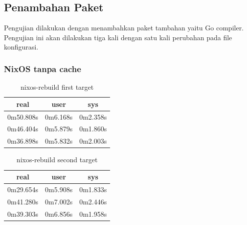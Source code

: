 \documentclass[10pt,]{report}
\begin{document}
\begin{adjustwidth}{20pt}{}
	\subsection{Penambahan Paket}
	\begin{adjustwidth}{20pt}{}
		Pengujian dilakukan dengan menambahkan paket tambahan yaitu Go compiler.
		Pengujian ini akan dilakukan tiga kali dengan satu kali perubahan pada file
		konfigurasi.
	\end{adjustwidth}
	\subsubsection{NixOS tanpa cache}
	\begin{table}[H]
		\caption{nixos-rebuild first target}
		\begin{center}
			\begin{tabular}[c]{|c|c|c|}
				\hline
				\multicolumn{1}{|c|}{\textbf{real}} &
				\multicolumn{1}{c|}{\textbf{user}}  &
				\multicolumn{1}{c|}{\textbf{sys}}                         \\
				\hline
				0m50.808s                           & 0m6.168s & 0m2.358s \\
				\hline
				0m46.404s                           & 0m5.879s & 0m1.860s \\
				\hline
				0m36.898s                           & 0m5.832s & 0m2.003s \\
				\hline
			\end{tabular}
		\end{center}
	\end{table}
	\begin{table}[H]
		\caption{nixos-rebuild second target}
		\begin{center}
			\begin{tabular}[c]{|c|c|c|}
				\hline
				\multicolumn{1}{|c|}{\textbf{real}} &
				\multicolumn{1}{c|}{\textbf{user}}  &
				\multicolumn{1}{c|}{\textbf{sys}}                         \\
				\hline
				0m29.654s                           & 0m5.908s & 0m1.833s \\
				\hline
				0m41.280s                           & 0m7.002s & 0m2.446s \\
				\hline
				0m39.303s                           & 0m6.856s & 0m1.958s \\
				\hline
			\end{tabular}
		\end{center}
	\end{table}

\end{adjustwidth}
\end{document}
